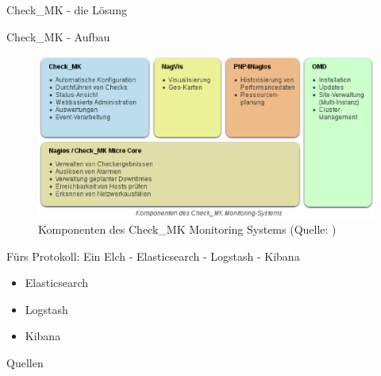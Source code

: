 \documentclass[11pt]{beamer}
\begin{document}
\begin{frame}{Check\_MK - die Lösung}
\end{frame}
\begin{frame}{Check\_MK - Aufbau}
	\begin{figure}
		\centering
		\includegraphics[width=1\textwidth]{pics/checkMKAufbau.eps}
		\caption[Komponenten des Check\_MK Monitoring Systems]{Komponenten des Check\_MK Monitoring Systems (Quelle: \textcite{checkmkmonitoringpic})}
	\end{figure}
\end{frame}
\begin{frame}{Fürs Protokoll: Ein Elch - Elasticsearch - Logstash - Kibana}
\begin{itemize}
	\item Elasticsearch
	\item Logstash
	\item Kibana
\end{itemize}
\end{frame}
\begin{frame}{Quellen}
	\printbibliography
\end{frame}
\end{document}

